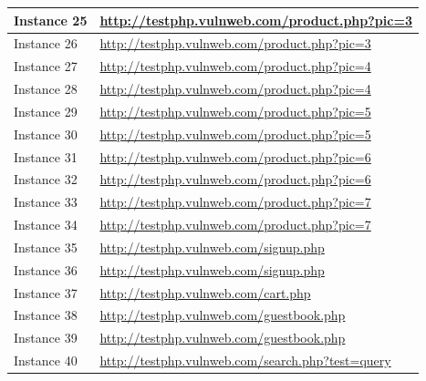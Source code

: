 \documentclass[12pt]{article}
\begin{document}
\begin{center}
\begin{longtable}{|l|p{10cm}|}
\hline
Instance 25 & \url{http://testphp.vulnweb.com/product.php?pic=3} \\
\hline
Instance 26 & \url{http://testphp.vulnweb.com/product.php?pic=3} \\
\hline
Instance 27 & \url{http://testphp.vulnweb.com/product.php?pic=4} \\
\hline
Instance 28 & \url{http://testphp.vulnweb.com/product.php?pic=4} \\
\hline
Instance 29 & \url{http://testphp.vulnweb.com/product.php?pic=5} \\
\hline
Instance 30 & \url{http://testphp.vulnweb.com/product.php?pic=5} \\
\hline
Instance 31 & \url{http://testphp.vulnweb.com/product.php?pic=6} \\
\hline
Instance 32 & \url{http://testphp.vulnweb.com/product.php?pic=6} \\
\hline
Instance 33 & \url{http://testphp.vulnweb.com/product.php?pic=7} \\
\hline
Instance 34 & \url{http://testphp.vulnweb.com/product.php?pic=7} \\
\hline
Instance 35 & \url{http://testphp.vulnweb.com/signup.php} \\
\hline
Instance 36 & \url{http://testphp.vulnweb.com/signup.php} \\
\hline
Instance 37 & \url{http://testphp.vulnweb.com/cart.php} \\
\hline
Instance 38 & \url{http://testphp.vulnweb.com/guestbook.php} \\
\hline
Instance 39 & \url{http://testphp.vulnweb.com/guestbook.php} \\
\hline
Instance 40 & \url{http://testphp.vulnweb.com/search.php?test=query} \\
\hline
\end{longtable}
\end{center}\vspace{0.7cm}
\end{document}
